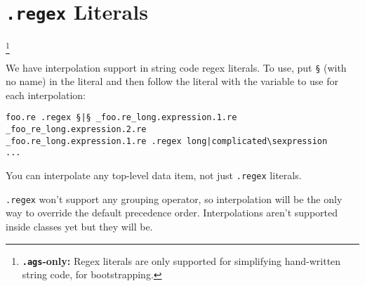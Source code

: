 \documentclass{article}
\newcommand\stringcode[1]{\texttt{#1}}
\newcommand\agsonly[1]{\footnote{\textbf{\texttt{.ags}-only: }#1}}
\begin{document}
\section{\stringcode{.regex} Literals}\agsonly{Regex literals are only supported for simplifying hand-written string code, for bootstrapping.}

We have interpolation support in string code regex literals.
To use, put \stringcode{§} (with no name) in the literal
and then follow the literal with the variable to use for each interpolation:
\begin{verbatim}
foo.re .regex §|§ _foo.re_long.expression.1.re _foo_re_long.expression.2.re
_foo.re_long.expression.1.re .regex long|complicated\sexpression
...
\end{verbatim}

You can interpolate any top-level data item, not just \stringcode{.regex} literals.

\stringcode{.regex} won't support any grouping operator,
so interpolation will be the only way to override the default precedence order.
Interpolations aren't supported inside classes yet but they will be.
\end{document}
